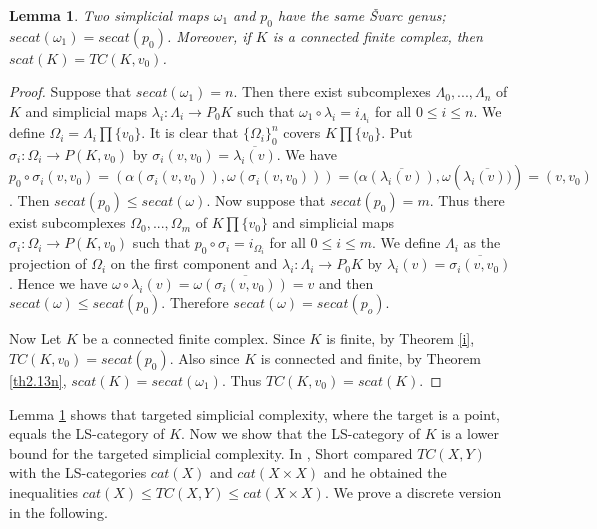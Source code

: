 \documentclass[preprint,11pt %
]{hjm1}
\newtheorem{lemma}[theorem]{Lemma}
\newtheorem{corollary}[theorem]{Corollary}
\theoremstyle{definition}
\begin{document}
\begin{lemma}\label{d}
Two simplicial maps $\omega_1$ and $p_0$ have the same \v{S}varc genus;
$secat(\omega_1)=secat(p_0)$.
Moreover, if $K$ is a connected finite complex, then $scat(K)=TC(K, v_0)$.
\end{lemma}

\begin{proof}
Suppose that $secat(\omega_1)=n$. Then there exist subcomplexes $\Lambda _0,...,\Lambda _n$ of $K$ and simplicial maps $\lambda _i :\Lambda _i\to P_0K$ such that $\omega_1 \circ \lambda _i=i_{\Lambda _i}$ for all $0\leq i\leq n$. We define $\Omega _i =\Lambda _i \prod \lbrace v_0 \rbrace $. It is clear that $\lbrace \Omega _i \rbrace _0 ^n$ covers $K\prod \lbrace  v_0\rbrace$. Put $\sigma _i:\Omega _i\to P(K,v_0)$ by $\sigma _i (v,v_0)=\overline{\lambda _i(v)}$. We have $p_0 \circ \sigma _i(v,v_0)=(\alpha (\sigma _i(v,v_0)),\omega(\sigma _i(v,v_0)))=(\alpha \overline{(\lambda _i(v))},\omega (\overline{\lambda _i(v))})=(v,v_0)$.
Then $secat(p_0)\leq secat(\omega)$. Now suppose that $secat(p_0)=m$. Thus there exist subcomplexes $\Omega _0,...,\Omega _m$ of $K\prod \lbrace v_0 \rbrace$ and simplicial maps $\sigma _i:\Omega _i\to P(K,v_0)$ such that $p_0 \circ \sigma _i=i_{\Omega _i}$ for all $0\leq i\leq m$. We define $\Lambda _i$ as the projection of $\Omega _i$ on the first component and $\lambda _i:\Lambda _i\to P_0K$ by $\lambda _i(v)=\overline{\sigma _i(v,v_0)}$. Hence we have $\omega \circ \lambda _i(v)=\omega \overline{(\sigma _i (v,v_0))}=v$ and  then $secat(\omega)\leq secat(p_0)$. Therefore $secat(\omega)= secat(p_o)$.


Now Let $K$ be a connected finite complex. Since $K$ is finite, by Theorem \ref{i}, $TC(K,v_0)=secat (p_0)$.
Also since $K$ is connected and finite, by Theorem \ref{th2.13n}, $scat (K) = secat (\omega_1)$. Thus $TC(K,v _0)=scat(K)$. 
\end{proof}



Lemma \ref{d} shows that targeted simplicial complexity, where the target is a point, equals the LS-category of $K$. 
Now we show that the LS-category of $K$ is a lower bound for the targeted simplicial complexity. 
In \cite{rel}, Short compared $TC(X,Y)$ with the LS-categories $cat(X)$ and $cat(X\times X)$ and he obtained the inequalities $cat(X)\le TC(X,Y) \le cat(X \times X)$. We prove a  discrete version in the following.
\end{document}
